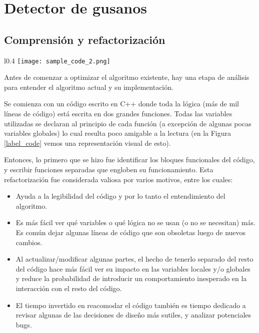 \documentclass{article}
\begin{document}
\newpage

\section{Detector de gusanos}

\subsection{Comprensión y refactorización}

\begin{wrapfigure}{l}{0.4\textwidth}
\centering
    \texttt{[image: sample\_code\_2.png]}
    \caption{representación visual del código}
    \label{label_code}
\end{wrapfigure}

Antes de comenzar a optimizar el algoritmo existente, hay una etapa de análisis para entender el algoritmo actual y su implementación.

Se comienza con un código escrito en C++ donde toda la lógica (más de mil líneas de código) está escrita en dos grandes funciones. Todas las variables utilizadas se declaran al principio de cada función (a excepción de algunas pocas variables globales) lo cual resulta poco amigable a la lectura (en la Figura \ref{label_code} vemos una representación visual de esto).

Entonces, lo primero que se hizo fue identificar los bloques funcionales del código, y escribir funciones separadas que engloben su funcionamiento. Esta refactorización fue considerada valiosa por varios motivos, entre los cuales:

\begin{itemize}
\item Ayuda a la legibilidad del código y por lo tanto el entendimiento del algoritmo.

\item Es más fácil ver qué variables o qué lógica no se usan (o no se necesitan) más. Es común dejar algunas líneas de código que son obsoletas luego de nuevos cambios.

\item Al actualizar/modificar algunas partes, el hecho de tenerlo separado del resto del código hace más fácil ver su impacto en las variables locales y/o globales y reduce la probabilidad de introducir un comportamiento inesperado en la interacción con el resto del código.

\item El tiempo invertido en reacomodar el código también es tiempo dedicado a revisar algunas de las decisiones de diseño más sutiles, y analizar potenciales bugs.
\end{itemize}
\end{document}
